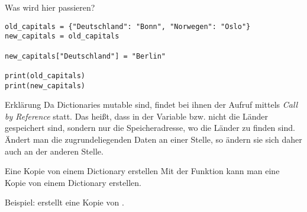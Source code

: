 \begin{fragile}
\begin{block}{Was wird hier passieren?}
\vspace{2pt}
\begin{verbatim}
old_capitals = {"Deutschland": "Bonn", "Norwegen": "Oslo"}
new_capitals = old_capitals

new_capitals["Deutschland"] = "Berlin" 

print(old_capitals)
print(new_capitals)
\end{verbatim}
\end{block}

\pause 
\vspace{12pt}

\begin{block}{Erklärung}
	\vspace{2pt}
Da Dictionaries mutable sind, findet bei ihnen der Aufruf mittels \emph{Call by Reference} statt. Das heißt, dass in der Variable  bzw.  nicht die Länder gespeichert sind, sondern nur die Speicheradresse, wo die Länder zu finden sind. Ändert man die zugrundeliegenden Daten an einer Stelle, so ändern sie sich daher auch an der anderen Stelle. 
\end{block}


\end{fragile}

\begin{frame}
	\begin{block}{Eine Kopie von einem Dictionary erstellen}
		\vspace{2pt}
		Mit der Funktion  kann man eine Kopie von einem Dictionary erstellen. 
		
		Beispiel:  erstellt eine Kopie von .
	\end{block}
\end{frame}




